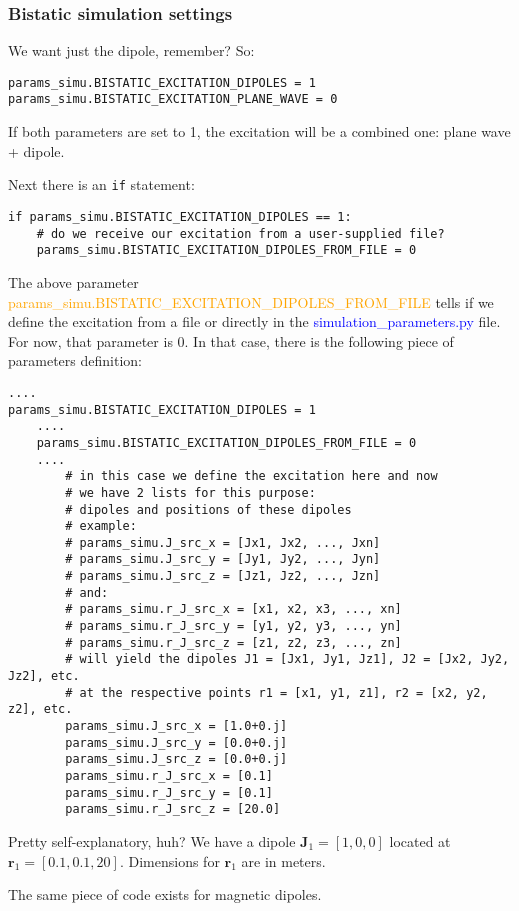 \documentclass[a4paper,10pt]{book}
\newcommand{\file}[1] {\textcolor{blue}{\textsf{#1}}}
\newcommand{\parameter}[1] {\textcolor{orange}{\textsf{#1}}}
\begin{document}
\subsubsection{Bistatic simulation settings}
%
\par
We want just the dipole, remember? So:
\begin{verbatim}
params_simu.BISTATIC_EXCITATION_DIPOLES = 1
params_simu.BISTATIC_EXCITATION_PLANE_WAVE = 0
\end{verbatim}
If both parameters are set to 1, the excitation will be a combined one: plane wave + dipole.
%
\par
Next there is an \texttt{if} statement:
\begin{verbatim}
if params_simu.BISTATIC_EXCITATION_DIPOLES == 1:
    # do we receive our excitation from a user-supplied file?
    params_simu.BISTATIC_EXCITATION_DIPOLES_FROM_FILE = 0
\end{verbatim}
The above parameter \parameter{params\_simu.BISTATIC\_EXCITATION\_DIPOLES\_FROM\_FILE} tells if we define the excitation from a file or directly in the \file{simulation\_parameters.py} file. For now, that parameter is $0$. In that case, there is the following piece of parameters definition:
\begin{verbatim}
....
params_simu.BISTATIC_EXCITATION_DIPOLES = 1
    ....
    params_simu.BISTATIC_EXCITATION_DIPOLES_FROM_FILE = 0
    ....
        # in this case we define the excitation here and now
        # we have 2 lists for this purpose: 
        # dipoles and positions of these dipoles
        # example:
        # params_simu.J_src_x = [Jx1, Jx2, ..., Jxn]
        # params_simu.J_src_y = [Jy1, Jy2, ..., Jyn]
        # params_simu.J_src_z = [Jz1, Jz2, ..., Jzn]
        # and:
        # params_simu.r_J_src_x = [x1, x2, x3, ..., xn]
        # params_simu.r_J_src_y = [y1, y2, y3, ..., yn]
        # params_simu.r_J_src_z = [z1, z2, z3, ..., zn]
        # will yield the dipoles J1 = [Jx1, Jy1, Jz1], J2 = [Jx2, Jy2, Jz2], etc.
        # at the respective points r1 = [x1, y1, z1], r2 = [x2, y2, z2], etc.
        params_simu.J_src_x = [1.0+0.j]
        params_simu.J_src_y = [0.0+0.j]
        params_simu.J_src_z = [0.0+0.j]
        params_simu.r_J_src_x = [0.1]
        params_simu.r_J_src_y = [0.1]
        params_simu.r_J_src_z = [20.0]
\end{verbatim}
Pretty self-explanatory, huh? We have a dipole $\mathbf{J}_1 = [1, 0, 0]$ located at $\mathbf{r}_1 = [0.1, 0.1, 20]$. Dimensions for $\mathbf{r}_1$ are in meters.
%
\par
The same piece of code exists for magnetic dipoles.
\end{document}

